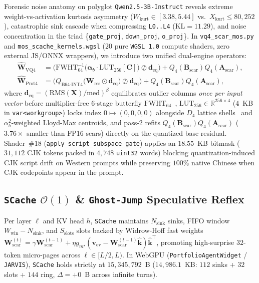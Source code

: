 \documentclass[10pt,twocolumn]{article}
\begin{document}
Forensic noise anatomy on polyglot \texttt{Qwen2.5-3B-Instruct} reveals extreme weight-vs-activation kurtosis asymmetry ($W_{\text{kurt}} \in [3.38, 5.44]$ vs.\ $X_{\text{kurt}} \le 80{,}252$), catastrophic sink cascade when compressing \texttt{L0..L4} ($\mathrm{KL}=11.29$), and noise concentration in the triad \{\texttt{gate\_proj}, \texttt{down\_proj}, \texttt{o\_proj}\}. In \texttt{vq4\_scar\_mos.py} and \texttt{mos\_scache\_kernels.wgsl} ($20$ pure \texttt{WGSL 1.0} compute shaders, zero external JS/ONNX wrappers), we introduce two unified dual-engine operators:
\begin{align}
    \widehat{\mathbf{W}}_{\text{VQ4}} &= \Big(\mathrm{FWHT}_{64}^{-1}\!\big(\boldsymbol{\alpha}_b \cdot \mathrm{LUT}_{256}[\mathbf{C}]\big) \oslash \mathbf{d}_{\text{eq}}\Big) + Q_4(\mathbf{B}_{\text{scar}}) Q_4(\mathbf{A}_{\text{scar}}), \nonumber \\
    \widehat{\mathbf{W}}_{\text{Prot4}} &= \Big(Q_{\text{B64-INT4}}\!\big(\mathbf{W}_{\text{res}} \odot \mathbf{d}_{\text{eq}}\big) \oslash \mathbf{d}_{\text{eq}}\Big) + Q_4(\mathbf{B}_{\text{scar}}) Q_4(\mathbf{A}_{\text{scar}}),
\end{align}
where $\mathbf{d}_{\text{eq}} = (\mathrm{RMS}(\mathbf{X})/\mathrm{med})^\beta$ equilibrates outlier columns \emph{once per input vector} before multiplier-free $6$-stage butterfly $\mathrm{FWHT}_{64}$~\citep{walsh1923closed}, $\mathrm{LUT}_{256} \in \mathbb{R}^{256 \times 4}$ ($4$~KB in \texttt{var<workgroup>}) locks index $0 \mapsto (0,0,0,0)$ alongside $D_4$ lattice shells~\citep{conway1982fast} and $\alpha_b^2$-weighted Lloyd-Max centroids, and pass-2 refits $Q_4(\mathbf{B}_{\text{scar}})Q_4(\mathbf{A}_{\text{scar}})$ ($3.76\times$ smaller than FP16 scars) directly on the quantized base residual. Shader~\#18 (\texttt{apply\_script\_subspace\_gate}) applies an $18.55$~KB bitmask ($31{,}112$ CJK tokens packed in $4{,}748$ \texttt{uint32} words) blocking quantization-induced CJK script drift on Western prompts while preserving $100\%$ native Chinese when CJK codepoints appear in the prompt.

\subsection{\texttt{SCache} $\mathcal{O}(1)$ \& \texttt{Ghost-Jump} Speculative Reflex}
Per layer $\ell$ and KV head $h$, \texttt{SCache} maintains $N_{\text{sink}}$ sinks, FIFO window $W_{\text{win}} - N_{\text{sink}}$, and $S_{\text{slots}}$ slots backed by Widrow-Hoff fast weights $\mathbf{W}_{\text{scar}}^{(t)} = \gamma \mathbf{W}_{\text{scar}}^{(t-1)} + \eta g_{m^\star}(\mathbf{v}_{\text{ev}} - \mathbf{W}_{\text{scar}}^{(t-1)}\hat{\mathbf{k}})\hat{\mathbf{k}}^\top$, promoting high-surprise $32$-token micro-pages across $\ell \in [L/2, L)$. In WebGPU (\texttt{PortfolioAgentWidget} / \texttt{JARVIS}), \texttt{SCache} holds strictly at $15{,}345{,}792$~B ($14{,}986.1$~KB: $112$ sinks + $32$ slots + $144$ ring, $\Delta = +0$~B across infinite turns).
\end{document}
